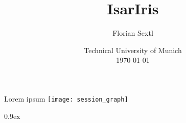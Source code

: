 \documentclass[11pt,a4paper]{article}
\begin{document}
\title{IsarIris}
\author{Florian Sextl}
\date{Technical University of Munich\\[\baselineskip] \today}
\maketitle

\tableofcontents
Lorem ipsum \cite{JoshBerdine.2004}
\texttt{[image: session\_graph]}

\newpage
\parindent 0pt
\parskip 0.9ex





\end{document}
